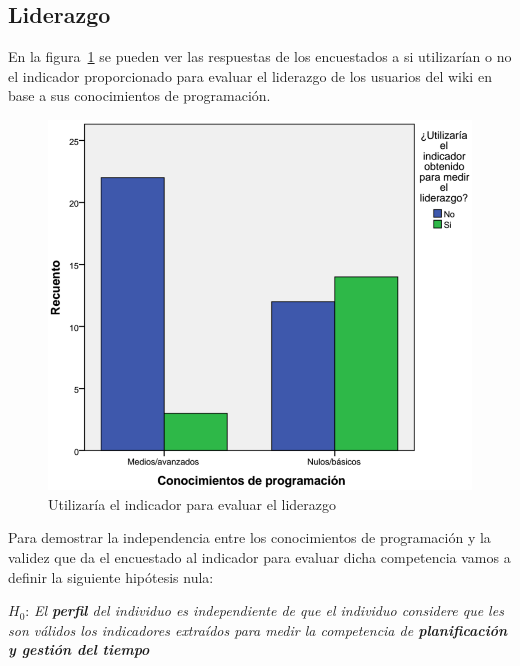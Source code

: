 \subsection{Liderazgo}

En la figura~\ref{fig:app:barras:programacion:liderazgo} se pueden ver las respuestas de los encuestados a si utilizarían o no el indicador proporcionado para evaluar el liderazgo de los usuarios del wiki en base a sus conocimientos de programación.

\begin{figure}
  \begin{center}
    \includegraphics[scale=0.3]{barras_programacion_liderazgo.png}
  \end{center}
  \caption{Utilizaría el indicador para evaluar el liderazgo}
  \label{fig:app:barras:programacion:liderazgo}
\end{figure}

Para demostrar la independencia entre los conocimientos de programación y la validez que da el encuestado al indicador para evaluar dicha competencia vamos a definir la siguiente hipótesis nula:

\begin{mdframed}[style=hipotesis0]
$H_0$: \emph{El \textbf{perfil} del individuo es independiente de que el individuo considere que les son válidos los indicadores extraídos para medir la competencia de \textbf{planificación y gestión del tiempo}}
\end{mdframed}

